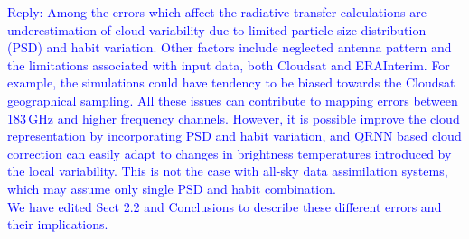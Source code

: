 \documentclass[11pt,a4paper]{article}
\begin{document}
\begin{itemize}
\textcolor{blue}{Reply: Among the errors which affect the radiative transfer calculations are underestimation of cloud variability due to limited particle size distribution (PSD) and habit variation. Other factors include neglected antenna pattern and the limitations associated with input data, both Cloudsat and ERAInterim. For example, the simulations could have tendency to be biased towards the Cloudsat geographical sampling. All these issues can contribute to mapping errors between 183\,GHz  and higher frequency channels. However, it is possible improve the cloud representation by incorporating PSD and habit variation, and QRNN based cloud correction can easily adapt to changes in brightness temperatures introduced by the local variability.  This is not the case with all-sky data assimilation systems, which may assume only single PSD and habit combination.\\
We have edited Sect 2.2 and Conclusions to describe these different errors and their implications.  }	

\end{itemize}
	
\end{document}

